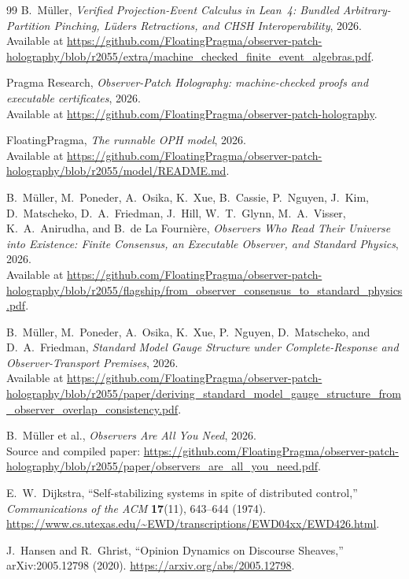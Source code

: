 \documentclass[11pt]{article}
\theoremstyle{remark}
\theoremstyle{plain}
\begin{document}
\begin{thebibliography}{99}
B.~M\"uller,
\emph{Verified Projection-Event Calculus in Lean~4: Bundled Arbitrary-Partition Pinching,
L\"uders Retractions, and CHSH Interoperability},
2026.\\
Available at \url{https://github.com/FloatingPragma/observer-patch-holography/blob/r2055/extra/machine_checked_finite_event_algebras.pdf}.

Pragma Research,
\emph{Observer-Patch Holography: machine-checked proofs and executable certificates},
2026.\\
Available at \url{https://github.com/FloatingPragma/observer-patch-holography}.

FloatingPragma,
\emph{The runnable OPH model},
2026.\\
Available at \url{https://github.com/FloatingPragma/observer-patch-holography/blob/r2055/model/README.md}.

B.~M\"uller, M.~Poneder, A.~Osika, K.~Xue, B.~Cassie, P.~Nguyen, J.~Kim, D.~Matscheko, D.~A.~Friedman, J.~Hill, W.~T.~Glynn, M.~A.~Visser, K.~A.~Anirudha, and B.~de La Fourni\`ere,
\emph{Observers Who Read Their Universe into Existence: Finite Consensus, an Executable Observer, and Standard Physics},
2026.\\
Available at \url{https://github.com/FloatingPragma/observer-patch-holography/blob/r2055/flagship/from_observer_consensus_to_standard_physics.pdf}.

B.~M\"uller, M.~Poneder, A.~Osika, K.~Xue, P.~Nguyen, D.~Matscheko, and D.~A.~Friedman,
\emph{Standard Model Gauge Structure under Complete-Response and Observer-Transport Premises},
2026.\\
Available at \url{https://github.com/FloatingPragma/observer-patch-holography/blob/r2055/paper/deriving_standard_model_gauge_structure_from_observer_overlap_consistency.pdf}.

B.~M\"uller et al.,
\emph{Observers Are All You Need},
2026.\\
Source and compiled paper:
\url{https://github.com/FloatingPragma/observer-patch-holography/blob/r2055/paper/observers_are_all_you_need.pdf}.

E.~W.~Dijkstra,
``Self-stabilizing systems in spite of distributed control,''
\emph{Communications of the ACM} \textbf{17}(11), 643--644 (1974).
\url{https://www.cs.utexas.edu/~EWD/transcriptions/EWD04xx/EWD426.html}.

J.~Hansen and R.~Ghrist,
``Opinion Dynamics on Discourse Sheaves,'' arXiv:2005.12798 (2020).
\url{https://arxiv.org/abs/2005.12798}.


\end{thebibliography}
\end{document}
